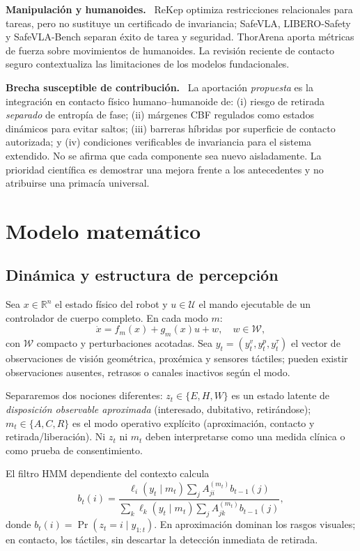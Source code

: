\documentclass[10pt,a4paper,twocolumn]{article}
\newcommand{\RR}{\mathbb{R}}
\newcommand{\calU}{\mathcal{U}}
\newcommand{\calW}{\mathcal{W}}
\newcommand{\subttl}[1]{\vspace{3pt}\noindent\textbf{\color{ink}#1.}~}
\begin{document}
\subttl{Manipulación y humanoides} ReKep \cite{r25} optimiza restricciones relacionales para tareas, pero no sustituye un certificado de invariancia; SafeVLA, LIBERO-Safety y SafeVLA-Bench \cite{r21,r22,r23} separan éxito de tarea y seguridad. ThorArena \cite{r24} aporta métricas de fuerza sobre movimientos de humanoides. La revisión reciente de contacto seguro \cite{r26} contextualiza las limitaciones de los modelos fundacionales.

\subttl{Brecha susceptible de contribución} La aportación \emph{propuesta} es la integración en contacto físico humano--humanoide de: (i) riesgo de retirada \emph{separado} de entropía de fase; (ii) márgenes CBF regulados como estados dinámicos para evitar saltos; (iii) barreras híbridas por superficie de contacto autorizada; y (iv) condiciones verificables de invariancia para el sistema extendido. No se afirma que cada componente sea nuevo aisladamente. La prioridad científica es demostrar una mejora frente a los antecedentes \cite{r1,r2,r3,r4,r5,r6} y no atribuirse una primacía universal.

\section{Modelo matemático}
\subsection{Dinámica y estructura de percepción}
Sea $x\in\RR^n$ el estado físico del robot y $u\in\calU$ el mando ejecutable de un controlador de cuerpo completo. En cada modo $m$:
\begin{equation}
 \dot x=f_m(x)+g_m(x)u+w,\quad w\in\calW,
 \label{eq:dyn}
\end{equation}
con $\calW$ compacto y perturbaciones acotadas. Sea $y_t=(y_t^v,y_t^p,y_t^{\tau})$ el vector de observaciones de visión geométrica, proxémica y sensores táctiles; pueden existir observaciones ausentes, retrasos o canales inactivos según el modo.

Separaremos dos nociones diferentes: $z_t\in\{E,H,W\}$ es un estado latente de \emph{disposición observable aproximada} (interesado, dubitativo, retirándose); $m_t\in\{A,C,R\}$ es el modo operativo explícito (aproximación, contacto y retirada/liberación). Ni $z_t$ ni $m_t$ deben interpretarse como una medida clínica o como prueba de consentimiento.

El filtro HMM dependiente del contexto calcula
\begin{equation}
 b_t(i)=\frac{\ell_i(y_t\mid m_t)\sum_j A^{(m_t)}_{ji}b_{t-1}(j)}{\sum_k\ell_k(y_t\mid m_t)\sum_j A^{(m_t)}_{jk}b_{t-1}(j)},
 \label{eq:hmm}
\end{equation}
donde $b_t(i)=\Pr(z_t=i\mid y_{1:t})$. En aproximación dominan los rasgos visuales; en contacto, los táctiles, sin descartar la detección inmediata de retirada.
\end{document}
